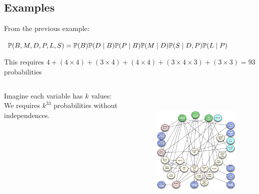 \subsection{Examples}
	\begin{frame}
		From the previous example:\\
		\begin{block}{}
			$\P( B , M , D , P , L , S ) = \P( B ) \P( D \mid B ) \P( P \mid B ) \P( M \mid D ) \P( S \mid D , P ) \P( L \mid P )$
		\end{block}
		This requires $4 + (4 \times 4) + (3 \times 4) + (4 \times 4) + (3 \times 4 \times 3) + (3 \times 3) = 93$ probabilities
	\end{frame}
	
	\begin{frame}[fragile]
		\begin{columns}
			\begin{column}{.3\linewidth}
				Imagine each variable has $k$ values:\\
				We requires $k^{33}$ probabilities without independences.
			\end{column}
			\begin{column}{.6\linewidth}
				\begin{figure}
					\centering
					\includegraphics[height=17em]{images/complexbn}
				\end{figure}
			\end{column}
		\end{columns}
		
	\end{frame}